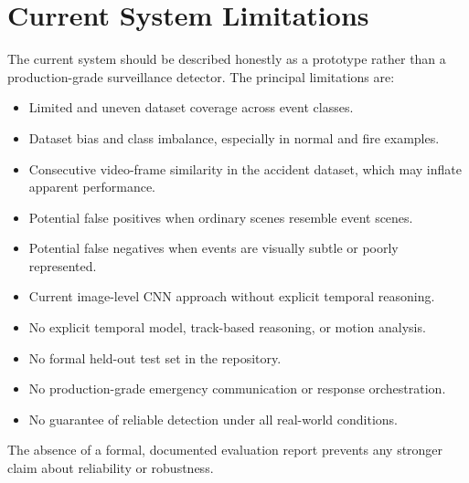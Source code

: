 \documentclass[11pt,a4paper]{article}
\begin{document}
\section{Current System Limitations}
The current system should be described honestly as a prototype rather than a production-grade surveillance detector. The principal limitations are:
\begin{itemize}[leftmargin=1.5em]
    \item Limited and uneven dataset coverage across event classes.
    \item Dataset bias and class imbalance, especially in normal and fire examples.
    \item Consecutive video-frame similarity in the accident dataset, which may inflate apparent performance.
    \item Potential false positives when ordinary scenes resemble event scenes.
    \item Potential false negatives when events are visually subtle or poorly represented.
    \item Current image-level CNN approach without explicit temporal reasoning.
    \item No explicit temporal model, track-based reasoning, or motion analysis.
    \item No formal held-out test set in the repository.
    \item No production-grade emergency communication or response orchestration.
    \item No guarantee of reliable detection under all real-world conditions.
\end{itemize}
The absence of a formal, documented evaluation report prevents any stronger claim about reliability or robustness.
\end{document}
